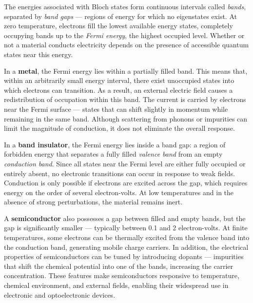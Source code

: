 The energies associated with Bloch states form continuous intervals called \emph{bands}, separated by \emph{band gaps} — regions of energy for which no eigenstates exist. At zero temperature, electrons fill the lowest available energy states, completely occupying bands up to the \emph{Fermi energy}, the highest occupied level. Whether or not a material conducts electricity depends on the presence of accessible quantum states near this energy.

In a \textbf{metal}, the Fermi energy lies within a partially filled band. This means that, within an arbitrarily small energy interval, there exist unoccupied states into which electrons can transition. As a result, an external electric field causes a redistribution of occupation within this band. The current is carried by electrons near the Fermi surface — states that can shift slightly in momentum while remaining in the same band. Although scattering from phonons or impurities can limit the magnitude of conduction, it does not eliminate the overall response.

In a \textbf{band insulator}, the Fermi energy lies inside a band gap: a region of forbidden energy that separates a fully filled \emph{valence band} from an empty \emph{conduction band}. Since all states near the Fermi level are either fully occupied or entirely absent, no electronic transitions can occur in response to weak fields. Conduction is only possible if electrons are excited across the gap, which requires energy on the order of several electron-volts. At low temperatures and in the absence of strong perturbations, the material remains inert.

A \textbf{semiconductor} also possesses a gap between filled and empty bands, but the gap is significantly smaller — typically between 0.1 and 2 electron-volts. At finite temperatures, some electrons can be thermally excited from the valence band into the conduction band, generating mobile charge carriers. In addition, the electrical properties of semiconductors can be tuned by introducing dopants — impurities that shift the chemical potential into one of the bands, increasing the carrier concentration. These features make semiconductors responsive to temperature, chemical environment, and external fields, enabling their widespread use in electronic and optoelectronic devices.

